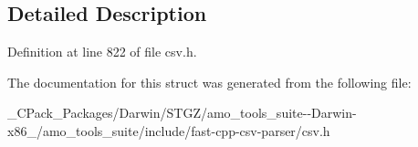 \subsection{Detailed Description}


Definition at line 822 of file csv.\+h.



The documentation for this struct was generated from the following file\+:\begin{DoxyCompactItemize}
\item 
\+\_\+\+C\+Pack\+\_\+\+Packages/\+Darwin/\+S\+T\+G\+Z/amo\+\_\+tools\+\_\+suite-\/-\/\+Darwin-\/x86\+\_/amo\+\_\+tools\+\_\+suite/include/fast-\/cpp-\/csv-\/parser/csv.\+h\end{DoxyCompactItemize}
